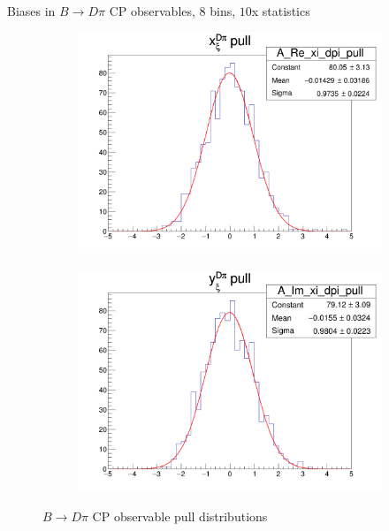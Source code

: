 \documentclass{beamer}
\begin{document}
\begin{frame}{Biases in $B\to D\pi$ CP observables, $8$ bins, $10$x statistics}
  \begin{figure}
    \centering
    \vspace{-0.2cm}
    \begin{subfigure}{0.5\textwidth}
      \includegraphics[width = 1.0\textwidth]{A_Re_xi_dpi_8Bins_StatsMultiplier10_pull.png}
    \end{subfigure}%
    \begin{subfigure}{0.5\textwidth}
      \includegraphics[width = 1.0\textwidth]{A_Im_xi_dpi_8Bins_StatsMultiplier10_pull.png}
    \end{subfigure}
    \caption{$B\to D\pi$ CP observable pull distributions}
  \end{figure}
\end{frame}
\end{document}
